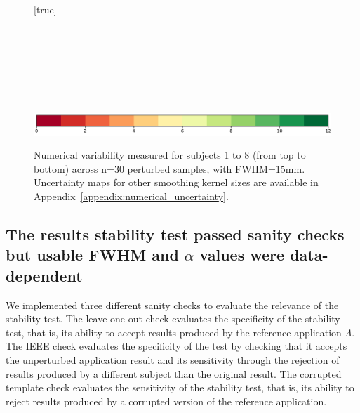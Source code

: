 \documentclass[lettersize,journal]{IEEEtran}
\begin{document}
\begin{figure}
  \centering
  [true] \\
   \\
   \\
   \\
   \\
   \\
   \\
   \\
  \includegraphics*[width=.6\linewidth]{figures/colorbar_sigbit_discrete.pdf}
  \caption{Numerical variability measured for subjects 1 to 8 (from top to bottom) across n=30 perturbed samples, with FWHM=15mm. Uncertainty maps for other smoothing kernel sizes are available in Appendix~\ref{appendix:numerical_uncertainty}.}
  \label{fig:uncertainty-maps}
\end{figure}


\subsection{The results stability test passed sanity checks but usable FWHM and $\alpha$ values were data-dependent}

We implemented three different sanity checks to evaluate the relevance of the stability test.
The leave-one-out check evaluates the specificity of the stability test, that is, its ability to accept results produced by the reference application $\Lambda$.
The IEEE check evaluates the specificity of the test by checking that it accepts the unperturbed application result and its sensitivity through the rejection of results produced by a different subject than the original result.
The corrupted template check evaluates the sensitivity of the stability test, that is, its ability to reject results produced by a corrupted version of the reference application.
\end{document}
